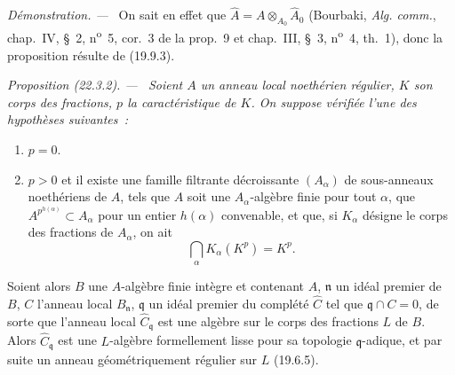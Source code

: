 \documentclass[10pt,oneside]{book}
\makeatletter
\newcommand{\setmanualcurrentlabel}[1]{\def\@currentlabel{#1}}
\newenvironment{proposition}[1][]{%
  \setmanualcurrentlabel{#1}\par\medskip\noindent\itshape Proposition (#1). ---\ }{\par}
\newenvironment{proof}{%
  \par\medskip\noindent\textit{Démonstration. ---\ }}{\par}
\makeatother
\begin{document}
\begin{proof}
On sait en effet que
$\widehat A=A\otimes_{A_0}\widehat A_0$ (Bourbaki,
\emph{Alg. comm.}, chap.~IV, §~2, n\textsuperscript{o}~5, cor.~3 de la
prop.~9 et chap.~III, §~3, n\textsuperscript{o}~4, th.~1), donc la proposition
résulte de (19.9.3).
\end{proof}

\begin{proposition}[22.3.2]
\label{0.22.3.2-fr}
Soient $A$ un anneau local noethérien régulier, $K$ son corps des fractions,
$p$ la caractéristique de $K$. On suppose vérifiée l'une des hypothèses
suivantes~:
\begin{enumerate}
  \item[(i)] $p=0$.
  \item[(ii)] $p>0$ et il existe une famille filtrante décroissante
  $(A_\alpha)$ de sous-anneaux noethériens de $A$, tels que $A$ soit une
  $A_\alpha$-algèbre finie pour tout $\alpha$, que
  $A^{p^{h(\alpha)}}\subset A_\alpha$ pour un entier $h(\alpha)$ convenable,
  et que, si $K_\alpha$ désigne le corps des fractions de $A_\alpha$, on ait
  \[
    \bigcap_\alpha K_\alpha(K^p)=K^p.
  \]
\end{enumerate}
Soient alors $B$ une $A$-algèbre finie intègre et contenant $A$,
$\mathfrak n$ un idéal premier de $B$, $C$ l'anneau local $B_\mathfrak n$,
$\mathfrak q$ un idéal premier du complété $\widehat C$ tel que
$\mathfrak q\cap C=0$, de sorte que l'anneau local
$\widehat C_\mathfrak q$ est une algèbre sur le corps des fractions $L$ de
$B$. Alors $\widehat C_\mathfrak q$ est une $L$-algèbre formellement lisse
pour sa topologie $\mathfrak q$-adique, et par suite un anneau
géométriquement régulier sur $L$ (19.6.5).
\end{proposition}
\end{document}
